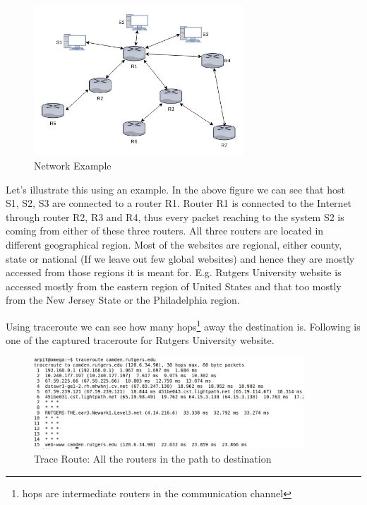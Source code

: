 \documentclass[12pt,oneside,a4paper]{article}
\begin{document}
\begin{figure}[H]
\centering
\includegraphics[width=0.70\textwidth]{routers.jpg}
\caption{Network Example} \label{fig:routers}
\end{figure}

Let's illustrate this using an example. In the above figure we can see that host S1, S2, S3 are connected to a router R1. Router R1 is connected to the Internet through router R2, R3 and R4, thus every packet reaching to the system S2 is coming from either of these three routers. All three routers are located in different geographical region. Most of the websites are regional, either county, state or national (If we leave out few global websites) and hence they are mostly accessed from those regions it is meant for. E.g. Rutgers University website is accessed mostly from the eastern region of United States and that too mostly from the New Jersey State or the Philadelphia region.\par
Using traceroute we can see how many hops\footnote{hops are intermediate routers in the communication channel} away the destination is. Following is one of the captured traceroute for Rutgers University website.\par
\begin{figure}[H]
\centering
\includegraphics[width=0.90\textwidth]{TraceRoute.png}
\caption{Trace Route: All the routers in the path to destination} \label{fig:traceroute}
\end{figure}
\end{document}
